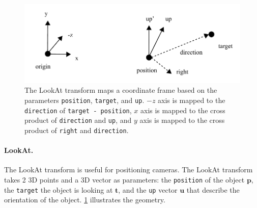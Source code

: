 


\begin{figure}[h]
    \centering
    \includegraphics[width=0.7\linewidth]{imgs/lookat.pdf}
    \caption{The LookAt transform maps a coordinate frame based on the parameters \lstinline{position}, \lstinline{target}, and \lstinline{up}. $-z$ axis is mapped to the \lstinline{direction} of \lstinline{target - position}, $x$ axis is mapped to the cross product of \lstinline{direction} and \lstinline{up}, and $y$ axis is mapped to the cross product of \lstinline{right} and \lstinline{direction}.}
    \label{fig:lookat}
\end{figure}


\paragraph{LookAt.} The LookAt transform is useful for positioning cameras. The LookAt transform takes 2 3D points and a 3D vector as parameters: the \lstinline{position} of the object $\mathbf{p}$, the \lstinline{target} the object is looking at $\mathbf{t}$, and the \lstinline{up} vector $\mathbf{u}$ that describe the orientation of the object. \cref{fig:lookat} illustrates the geometry.

